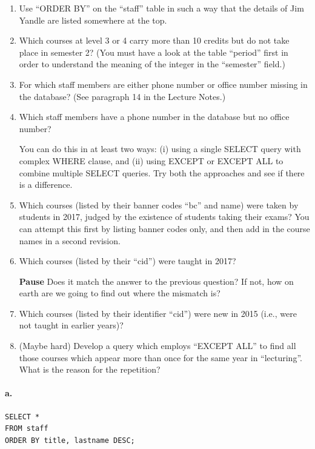 \begin{enumerate}[label=\alph*)]
\item Use ``ORDER BY'' on the ``staff'' table in such a way that the details of Jim Yandle are listed somewhere at the top.

\item Which courses at level 3 or 4 carry more than 10 credits but do not take place in semester 2? (You must have a look at the table ``period'' first in order to understand the meaning of the integer in the ``semester'' field.)

\item For which staff members are either phone number or office number missing in the database? (See paragraph 14 in the Lecture Notes.)

\item Which staff members have a phone number in the database but no office number?

You can do this in at least two ways: (i) using a single SELECT query with complex WHERE clause, and (ii) using EXCEPT or EXCEPT ALL to combine multiple SELECT queries. Try both the approaches and see if there is a difference.

\item Which courses (listed by their banner codes ``bc'' and name) were taken by students in 2017, judged by the existence of students taking their exams? You can attempt this first by listing banner codes only, and then add in the course names in a second revision.

\item Which courses (listed by their ``cid'') were taught in 2017?

\textbf{Pause} Does it match the answer to the previous question? If not, how on earth are we going to find out where the mismatch is?

\item Which courses (listed by their identifier ``cid'') were new in 2015 (i.e., were not taught in earlier years)?

\item (Maybe hard) Develop a query which employs ``EXCEPT ALL'' to find all those courses which appear more than once for the same year in ``lecturing''. What is the reason for the repetition?
\end{enumerate}

\paragraph{a.}
\begin{verbatim}
SELECT *
FROM staff
ORDER BY title, lastname DESC;
\end{verbatim}

